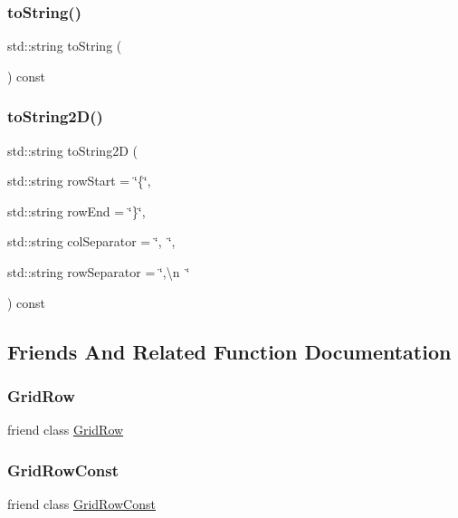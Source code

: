 \mbox{\label{classGrid_a1fe5121d6528fdea3f243321b3fa3a49}} 
\subsubsection{\texorpdfstring{to\+String()}{toString()}}
{\footnotesize\ttfamily std\+::string to\+String (\begin{DoxyParamCaption}{ }\end{DoxyParamCaption}) const}

\mbox{\label{classGrid_a8e636ad8b56218c7e0162d6c1bd78b39}} 
\subsubsection{\texorpdfstring{to\+String2\+D()}{toString2D()}}
{\footnotesize\ttfamily std\+::string to\+String2D (\begin{DoxyParamCaption}\item[{std\+::string}]{row\+Start = {\ttfamily \char`\"{}\{\char`\"{}},  }\item[{std\+::string}]{row\+End = {\ttfamily \char`\"{}\}\char`\"{}},  }\item[{std\+::string}]{col\+Separator = {\ttfamily \char`\"{},~\char`\"{}},  }\item[{std\+::string}]{row\+Separator = {\ttfamily \char`\"{},\textbackslash{}n~\char`\"{}} }\end{DoxyParamCaption}) const}



\subsection{Friends And Related Function Documentation}
\mbox{\label{classGrid_a20059dcdf5d8836488337c056079f5e2}} 
\subsubsection{\texorpdfstring{Grid\+Row}{GridRow}}
{\footnotesize\ttfamily friend class \mbox{\hyperlink{classGrid_1_1GridRow}{Grid\+Row}}\hspace{0.3cm}{\ttfamily [friend]}}

\mbox{\label{classGrid_aba3ef1df6ffede859468bdcab36ab6d6}} 
\subsubsection{\texorpdfstring{Grid\+Row\+Const}{GridRowConst}}
{\footnotesize\ttfamily friend class \mbox{\hyperlink{classGrid_1_1GridRowConst}{Grid\+Row\+Const}}\hspace{0.3cm}{\ttfamily [friend]}}


